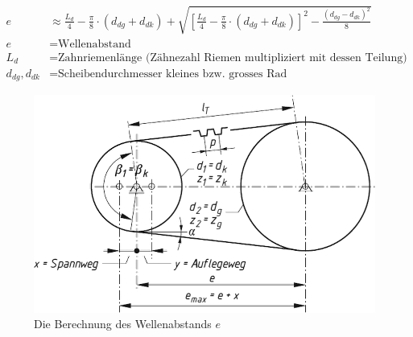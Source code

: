 \begin{align}
    e   &\approx \frac{L_d}{4} - \frac{\pi}{8} \cdot (d_{dg} + d_{dk}) + \sqrt{\left[\frac{L_d}{4}-\frac{\pi}{8} \cdot (d_{dg} + d_{dk})\right]^2 - \frac{(d_{dg}-d_{dk})^2}{8}} \label{eq:wellenabstand} \\
    e   &= \text{Wellenabstand} \nonumber \\
    L_d &= \text{Zahnriemenlänge (Zähnezahl Riemen multipliziert mit dessen Teilung)} \nonumber \\
    d_{dg}, d_{dk} &= \text{Scheibendurchmesser kleines bzw. grosses Rad} \nonumber
\end{align}

\begin{figure}[H]
    \centering
    \includegraphics[width=0.7\linewidth]{pics/riemengetriebe.png}
    \caption{Die Berechnung des Wellenabstands $e$ \protect\cite[S. 206]{roloff-matek}}
    \label{fig:riemengetriebe}
\end{figure}
